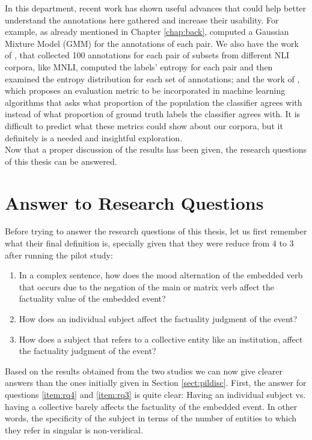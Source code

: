 In this department, recent work has shown useful advances that could help better understand the annotations here gathered and increase their usability. For example, as already mentioned in Chapter \ref{chap:back}, \citet{pavlick2019inherent} computed a Gaussian Mixture Model (GMM) for the annotations of each pair. We also have the work of \citet{nie2020can}, that collected 100 annotations for each pair of subsets from different NLI corpora, like MNLI, computed the labels' entropy for each pair and then examined the entropy distribution for each set of annotations; and the work of \citet{gordon2021disagreement}, which proposes an evaluation metric to be incorporated in machine learning algorithms that asks what proportion of the population the classifier agrees with instead of what proportion of ground truth labels the classifier agrees with. It is difficult to predict what these metrics could show about our corpora, but it definitely is a needed and insightful exploration. \\

Now that a proper discussion of the results has been given, the research questions of this thesis can be answered.\\

\section{Answer to Research Questions}
Before trying to answer the research questions of this thesis, let us first remember what their final definition is, specially given that they were reduce from $4$ to $3$ after running the pilot study:\\

\begin{enumerate}[RQ1.-]
        \item In a complex sentence, how does the mood alternation of the embedded verb that occurs due to the negation of the main or matrix verb affect the factuality value of the embedded event?\label{item:rq1}
        \item How does an individual subject affect the factuality judgment of the event?\label{item:rq3}
        \item How does a subject that refers to a collective entity like an institution, affect the factuality judgment of the event?\label{item:rq4}
\end{enumerate}

Based on the results obtained from the two studies we can now give clearer answers than the ones initially given in Section \ref{sect:pildisc}. First, the answer for questions \ref{item:rq4} and \ref{item:rq3} is quite clear: Having an individual subject vs. having a collective barely affects the factuality of the embedded event. In other words, the specificity of the subject in terms of the number of entities to which they refer in singular is non-veridical.\\

